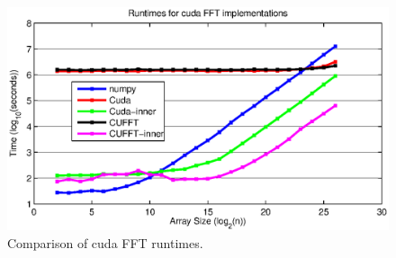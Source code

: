 \begin{figure}
    \centering
    \includegraphics{img/cudaRuntimes.eps}
    \caption{Comparison of cuda FFT runtimes.}
    \label{cudaRuntimes}
\end{figure}